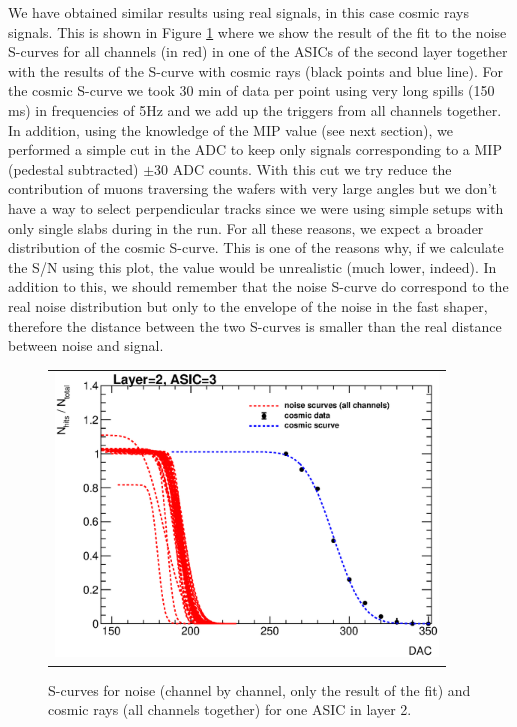\documentclass[a4paper,11pt]{article}
\begin{document}
We have obtained similar results using real signals, in this case cosmic rays signals. This is shown 
in Figure \ref{scurves_cosmics}  where 
we show the result of the fit to the noise S-curves for all channels (in red) in one of the ASICs of 
the second layer together with the results of the S-curve with cosmic rays (black points and blue 
line). For the cosmic S-curve we took 30 min of data per point using very long spills (150 ms) in 
frequencies of 5Hz and we add up the triggers from all channels together. In addition, using the 
knowledge of the MIP value (see next section), we performed a simple cut in the ADC
to keep only signals corresponding to a MIP 
(pedestal subtracted) $\pm30$ ADC counts. With this cut we try reduce the contribution of muons 
traversing the wafers with very large angles but we don't have a way to select perpendicular tracks 
since we were using simple setups with only single slabs during in the run. For all these reasons, we expect
a broader distribution of the cosmic S-curve. This is one of the reasons why, if we calculate the S/N 
using this plot, the value would be unrealistic (much lower, indeed). 
In addition to this, we should remember that the noise S-curve do correspond to the real noise 
distribution but only to the envelope of the noise in the fast shaper, therefore the
distance between the two S-curves is smaller than the real distance between noise and signal.

\begin{figure}[!t]
    \centering
  \begin{tabular}{l}
	\includegraphics[width=4in]{figs/commissioning/cosmic_scurves_asic3_layer2.eps} 
	\end{tabular}
\caption{S-curves for noise (channel by channel, only the result of the fit) and cosmic rays (all channels together) for one ASIC in layer 2.}
\label{scurves_cosmics}
\end{figure}
\end{document}
